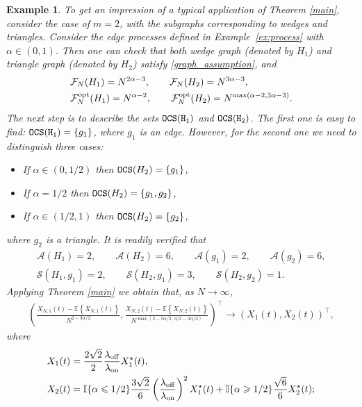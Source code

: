 \documentclass[11pt,reqno]{amsart}
\numberwithin{equation}{section}
\newcommand{\E}[1]{\mathbb{E}\left\{ #1\right\}}
\newtheorem{example}[theo]{Example}
\newcommand{\netheo}[1]{{Theorem \ref{#1}}}
\begin{document}
{\begin{example}\label{ex:subgraphs} \em To get an impression of a typical application of Theorem \ref{main}, consider the case of $m=2$, with the subgraphs corresponding to wedges and triangles.
Consider the edge processes defined in Example~\ref{ex:process} with $\alpha\in(0,1)$. Then one can check that both wedge graph (denoted by ${H}_1$) and triangle graph (denoted by ${H}_2$) satisfy \eqref{graph_assumption}, and
\begin{align*}
    &\mathcal{F}_N({H}_1) = N^{2\alpha - 3},\qquad \mathcal{F}_N({H}_2) = N^{3\alpha - 3},\\
    &\mathcal{F}^{\rm opt}_N({H}_1) = N^{\alpha - 2},\qquad \mathcal{F}^{\rm opt}_N({H}_2) = N^{\max(\alpha - 2, 3\alpha - 3)}.
\end{align*}
{The next step is to describe the sets ${\tt OCS(H_1)}$ and ${\tt OCS(H_2)}$. The first one is easy to find: ${\tt OCS(H_1)} = \{g_1\}$, where $g_1$ is an edge. However, for the second one we need to distinguish three cases:}
\begin{itemize}
    \item[$\circ$]{If $\alpha\in(0,1/2)$ then ${\tt OCS}({H}_2) = \{g_1\}$},
    \item[$\circ$]{If $\alpha=1/2$ then ${\tt OCS}({H}_2) = \{g_1,g_2\}$},
    \item[$\circ$]{If $\alpha\in(1/2,1)$ then ${\tt OCS}({H}_2) = \{g_2\}$},
\end{itemize}
where $g_2$ is a triangle. It is readily verified  that
\begin{align*}
    \mathcal{A}({H}_1) = 2,\qquad \mathcal{A}({H}_2) = 6,\qquad \mathcal{A}(g_1) = 2,\qquad \mathcal{A}(g_2) = 6,\\
    \mathcal{S}({H}_1,g_1) = 2,\qquad \mathcal{S}({H}_2,g_1) = 3,\qquad \mathcal{S}({H}_2,g_2) = 1.
\end{align*}
Applying \netheo{main} we obtain that, as $N\to\infty$,
\begin{align*}
    \left(\frac{X_{N,1}(t) - \E{X_{N,1}(t)}}{N^{ 2 - 3\alpha/2}} , \frac{X_{N,2}(t) - \E{X_{N,2}(t)}}{N^{\max(2-5\alpha/2,\, 3/2 - 3\alpha/2)}}\right)^{\top}\to (X_1(t),X_2(t))^{\top},
\end{align*}
where
\begin{align*}
    X_1(t) &= \frac{2\sqrt{2}}{2}\frac{\lambda_{\rm off}}{\lambda_{\rm on}}X_1^{\star}(t),\\
    X_2(t) &= \mathbb{I}\{\alpha\leqslant 1/2\}\frac{3\sqrt{2}}{6}\left(\frac{\lambda_{\rm off}}{\lambda_{\rm on}}\right)^2X_1^{\star}(t) + \mathbb{I}\{\alpha\geqslant 1/2\}\frac{\sqrt{6}}{6}X^{\star}_2(t);

\end{align*}
\end{example}}
\end{document}
